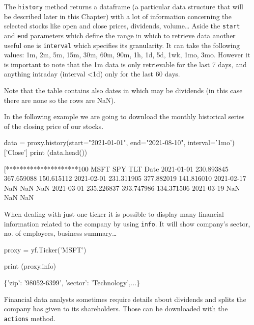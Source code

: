 The \texttt{history} method returns a dataframe (a particular data structure that will be described later in this Chapter) with a lot of information concerning the selected stocks like open and close prices, dividends, volume\ldots
Aside the \texttt{start} and \texttt{end} parameters which define the range in which to retrieve data another useful one is \texttt{interval} which specifies its granularity. It can take the following values: 1m, 2m, 5m, 15m, 30m, 60m, 90m, 1h, 1d, 5d, 1wk, 1mo, 3mo. However it is important to note that the 1m data is only retrievable for the last 7 days, and anything intraday (interval <1d) only for the last 60 days.

Note that the table contains also dates in which may be dividends (in this case there are none so the rows are NaN).
  
In the following example we are going to download the monthly historical series of the closing price of our stocks.

\begin{ipythonnon}
data = proxy.history(start="2021-01-01", end="2021-08-10", 
                     interval='1mo')['Close']
print (data.head())
\end{ipythonnon}
\begin{ioutput}
[*********************100%
                  MSFT         SPY         TLT
Date                                          
2021-01-01  230.893845  367.659088  150.615112
2021-02-01  231.311905  377.882019  141.816010
2021-02-17         NaN         NaN         NaN
2021-03-01  235.226837  393.747986  134.371506
2021-03-19         NaN         NaN         NaN
\end{ioutput}

When dealing with just one ticker it is possible to display many financial information related to the company by using \texttt{info}. It will show company's sector, no. of employees, business summary\ldots

\begin{ipythonnon}
proxy = yf.Ticker('MSFT')

print (proxy.info)
\end{ipythonnon}
\begin{ioutput}
\{'zip': '98052-6399', 'sector': 'Technology',...\}
\end{ioutput}

Financial data analysts sometimes require details about dividends and splits the company has given to its shareholders. Those can be downloaded with the \texttt{actions} method.

